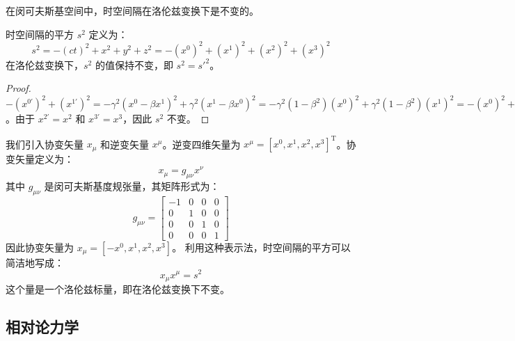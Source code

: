 \documentclass[fontset=none]{ctexart}
\begin{document}
在闵可夫斯基空间中，时空间隔在洛伦兹变换下是不变的。
\begin{theorem}[时空间隔不变性]
时空间隔的平方 $s^2$ 定义为：
\begin{equation}
s^2 = -(ct)^2 + x^2 + y^2 + z^2 = -(x^0)^2 + (x^1)^2 + (x^2)^2 + (x^3)^2
\end{equation}
在洛伦兹变换下，$s^2$ 的值保持不变，即 $s^2 = s'^{2}$。
\end{theorem}
\begin{proof}
$-(x^{0'})^2 + (x^{1'})^2 = -\gamma^2(x^0 - \beta x^1)^2 + \gamma^2(x^1 - \beta x^0)^2 = -\gamma^2(1-\beta^2)(x^0)^2 + \gamma^2(1-\beta^2)(x^1)^2 = -(x^0)^2 + (x^1)^2$。由于 $x^{2'}=x^2$ 和 $x^{3'}=x^3$，因此 $s^2$ 不变。
\end{proof}
我们引入协变矢量 $x_{\mu}$ 和逆变矢量 $x^{\mu}$。逆变四维矢量为 $x^{\mu} = [x^0, x^1, x^2, x^3]^{\mathrm{T}}$。协变矢量定义为：
\begin{equation}
x_{\mu} = g_{\mu\nu}x^{\nu}
\end{equation}
其中 $g_{\mu\nu}$ 是闵可夫斯基度规张量，其矩阵形式为：
\begin{equation}
g_{\mu\nu} = \begin{bmatrix} -1 & 0 & 0 & 0 \\ 0 & 1 & 0 & 0 \\ 0 & 0 & 1 & 0 \\ 0 & 0 & 0 & 1 \end{bmatrix}
\end{equation}
因此协变矢量为 $x_{\mu} = [-x^0, x^1, x^2, x^3]$。
利用这种表示法，时空间隔的平方可以简洁地写成：
\begin{equation}
x_{\mu}x^{\mu} = s^2
\end{equation}
这个量是一个洛伦兹标量，即在洛伦兹变换下不变。

\subsection{相对论力学}
\end{document}
